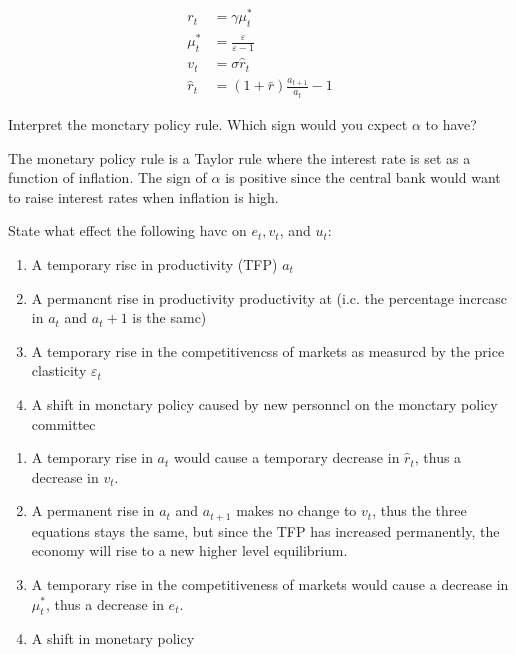 \begin{note}
    \begin{align*}
        r_t &=\gamma \mu_t^*\\
        \mu_t^* &= \frac{\varepsilon}{\varepsilon-1}\\
        v_t &= \sigma \hat{r}_t\\
        \hat{r}_t &= (1+\bar{r})\frac{a_{t+1}}{a_t}-1
    \end{align*}
\end{note}

\begin{problem*}[1]
    Interpret the monctary policy rule. Which sign would you cxpect $\alpha$ to have?
\end{problem*}

\begin{solution}
    The monetary policy rule is a Taylor rule where the interest rate is set as a function of inflation.
    The sign of $\alpha$ is positive since the central bank would want to raise interest rates when inflation is high.
\end{solution}

\begin{problem*}[2]
    State what effect the following havc on $e_t,v_t$, and $u_t:$
    \begin{enumerate}
        \item A temporary risc in productivity (TFP) $a_t$
        \item A permancnt rise in productivity productivity at (i.c. the percentage incrcasc in $a_t$ and $a_t+1$
        is the samc)
        \item A temporary rise in the competitivencss of markets as measurcd by the price clasticity $\varepsilon_t$
        \item A shift in monctary policy caused by new personncl on the monctary policy committec
    \end{enumerate}
\end{problem*}

\begin{solution}
    \begin{enumerate}
        \item A temporary rise in $a_t$ would cause a temporary decrease in $\hat{r}_t$, thus a decrease in $v_t$.
        \item A permanent rise in $a_t$ and $a_{t+1}$ makes no change to $v_t$, thus the three equations stays the same, 
        but since the TFP has increased permanently, the economy will rise to a new higher level equilibrium.  
        \item A temporary rise in the competitiveness of markets would cause a decrease in $\mu_t^*$, thus a decrease in $e_t$.
        \item A shift in monetary policy
    \end{enumerate}
\end{solution}

